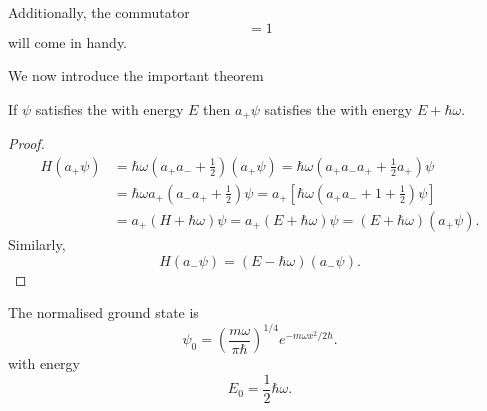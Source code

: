\begin{prt}
Additionally, the commutator
\begin{equation}
[a_-,a_+]=1
\end{equation}
will come in handy.
\end{prt}
We now introduce the important theorem
\begin{thrm}
If $\psi$ satisfies the \sch with energy $E$ then $a_+\psi$ satisfies the \sch with energy $E+\hbar\omega$.
\end{thrm}
\begin{proof}
\begin{subequations}
\begin{align}
H(a_+\psi)&=\hbar\omega\left(a_+a_-+\frac{1}{2} \right)(a_+\psi)=\hbar\omega\left( a_+a_-a_++\frac{1}{2}a_+\right)\psi\\
&=\hbar\omega a_+\left(a_-a_++\frac{1}{2} \right)\psi=a_+\left[\hbar\omega\left(a_+a_-+1+\frac{1}{2} \right)\psi\right]\\
&=a_+(H+\hbar\omega)\psi=a_+(E+\hbar\omega)\psi=(E+\hbar\omega)(a_+\psi).
\end{align}
\end{subequations}
Similarly,
\begin{equation}
H(a_-\psi)=(E-\hbar\omega)(a_-\psi).
\end{equation}
\end{proof}
\begin{coro}
The normalised ground state is
\begin{equation}
\psi_0=\left(\frac{m\omega}{\pi\hbar} \right)^{1/4}e^{-m\omega x^2/2\hbar}.
\end{equation}
with energy
\begin{equation}
E_0=\frac{1}{2}\hbar\omega.
\end{equation}
\end{coro}
